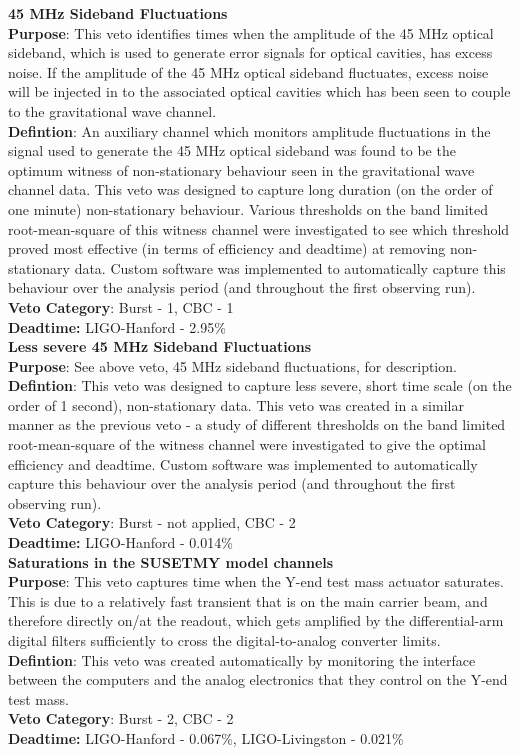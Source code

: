 \textbf{45 MHz Sideband Fluctuations} \\
\textbf{Purpose}: This veto identifies times when the amplitude of the 45 MHz
optical sideband, which is used to generate error signals for optical cavities,
has excess noise. If the amplitude of the 45 MHz optical sideband fluctuates,
excess noise will be injected in to the associated optical cavities which has
been seen to couple to the gravitational wave channel.\\
\textbf{Defintion}: An auxiliary channel which monitors amplitude fluctuations
in the signal used to generate the 45 MHz optical sideband was found to be the
optimum witness of non-stationary behaviour seen in the gravitational wave
channel data. This veto was designed to capture long duration (on the order of
one minute) non-stationary behaviour. Various thresholds on the band limited
root-mean-square of this
witness channel were investigated to see which threshold proved most effective
(in terms of efficiency and deadtime) at removing non-stationary data.
Custom software was implemented to automatically capture this behaviour over
the analysis period (and throughout the first observing run).\\
\textbf{Veto Category}: Burst - 1, CBC - 1\\
\textbf{Deadtime:} LIGO-Hanford - 2.95\%
\\

\textbf{Less severe 45 MHz Sideband Fluctuations} \\
\textbf{Purpose}: See above veto, 45 MHz sideband fluctuations, for
description.\\
\textbf{Defintion}: This veto was designed to capture less severe, short time
scale (on the order of 1 second), non-stationary data. This veto was created
in a similar manner as the previous veto - a study of different thresholds
on the band limited root-mean-square of the witness channel were investigated
to give the optimal efficiency and deadtime. Custom software was implemented to
automatically capture this behaviour over the analysis period (and throughout
the first observing run).\\
\textbf{Veto Category}: Burst - not applied, CBC - 2\\
\textbf{Deadtime:} LIGO-Hanford - 0.014\%
\\

\textbf{Saturations in the SUSETMY model channels} \\
\textbf{Purpose}: This veto captures time when the Y-end test mass actuator
saturates. This is due to a relatively fast transient that is on the main
carrier beam, and therefore directly on/at the readout, which gets amplified
by the differential-arm digital filters sufficiently to cross the
digital-to-analog converter limits.\\
\textbf{Defintion}: This veto was created automatically by monitoring the
interface between the computers and the analog electronics that they control on
the Y-end test mass.\\
\textbf{Veto Category}: Burst - 2, CBC - 2\\
\textbf{Deadtime:} LIGO-Hanford - 0.067\%, LIGO-Livingston - 0.021\%
\\

